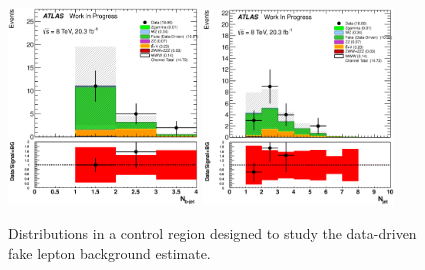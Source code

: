 \begin{figure}[tb]
\includegraphics[width=0.45\textwidth]{figures/Fake_CR/NBTaggedJets_histratio.eps}
\includegraphics[width=0.45\textwidth]{figures/Fake_CR/NJets_histratio.eps}
\caption{Distributions in a control region designed to study the data-driven 
fake lepton background estimate.  }
\label{fig:FakeCR}
\end{figure}



\FloatBarrier



%

